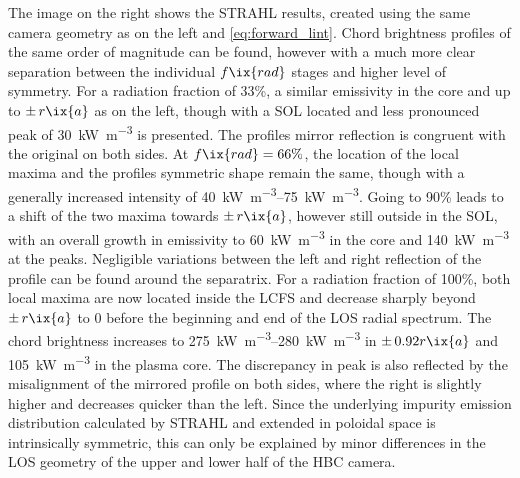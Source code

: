             The image on the right shows the STRAHL results, created using the same camera geometry as on the left and \cref{eq:forward_lint}. Chord brightness profiles of the same order of magnitude can be found, however with a much more clear separation between the individual $f\ix{rad}$ stages and higher level of symmetry. For a radiation fraction of 33\%, a similar emissivity in the core and up to $\pm\,r\ix{a}$ as on the left, though with a SOL located and less pronounced peak of \SI{30}{\kilo\watt\per\cubic\meter} is presented. The profiles mirror reflection is congruent with the original on both sides. At $f\ix{rad}=66\%$, the location of the local maxima and the profiles symmetric shape remain the same, though with a generally increased intensity of \SIrange{40}{75}{\kilo\watt\per\cubic\meter}. Going to 90\% leads to a shift of the two maxima towards $\pm\,r\ix{a}$, however still outside in the SOL, with an overall growth in emissivity to \SI{60}{\kilo\watt\per\cubic\meter} in the core and \SI{140}{\kilo\watt\per\cubic\meter} at the peaks. Negligible variations between the left and right reflection of the profile can be found around the separatrix. For a radiation fraction of 100\%, both local maxima are now located inside the LCFS and decrease sharply beyond $\pm\,r\ix{a}$ to 0 before the beginning and end of the LOS radial spectrum. The chord brightness increases to \SIrange{275}{280}{\kilo\watt\per\cubic\meter} in $\pm\,0.92r\ix{a}$ and \SI{105}{\kilo\watt\per\cubic\meter} in the plasma core. The discrepancy in peak is also reflected by the misalignment of the mirrored profile on both sides, where the right is slightly higher and decreases quicker than the left. Since the underlying impurity emission distribution calculated by STRAHL and extended in poloidal space is intrinsically symmetric, this can only be explained by minor differences in the LOS geometry of the upper and lower half of the HBC camera.\\%
%
